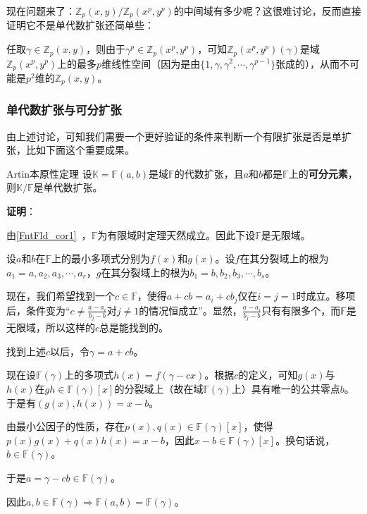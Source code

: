 现在问题来了：$\mathbb{Z}_p(x, y)/\mathbb{Z}_p(x^p, y^p)$的中间域有多少呢？这很难讨论，反而直接证明它不是单代数扩张还简单些：

任取$\gamma\in\mathbb{Z}_p(x, y)$，则由于$\gamma^p\in\mathbb{Z}_p(x^p, y^p)$，可知$\mathbb{Z}_p(x^p, y^p)(\gamma)$是域$\mathbb{Z}_p(x^p, y^p)$上的最多$p$维线性空间（因为是由$\{1,\gamma, \gamma^2, \cdots, \gamma^{p-1}\}$张成的），从而不可能是$p^2$维的$\mathbb{Z}_p(x, y)$。


\subsubsection{单代数扩张与可分扩张}

由上述讨论，可知我们需要一个更好验证的条件来判断一个有限扩张是否是单扩张，比如下面这个重要成果。

\begin{theorem}{Artin本原性定理}\label{PrmtEl_the2}
设$\mathbb{K}=\mathbb{F}(a, b)$是域$\mathbb{F}$的代数扩张，且$a$和$b$都是$\mathbb{F}$上的\textbf{可分元素}，则$\mathbb{K}/\mathbb{F}$是单代数扩张。
\end{theorem}

\textbf{证明}：

由\autoref{FntFld_cor1}~，$\mathbb{F}$为有限域时定理天然成立。因此下设$\mathbb{F}$是无限域。

设$a$和$b$在$\mathbb{F}$上的最小多项式分别为$f(x)$和$g(x)$。设$f$在其分裂域上的根为$a_1=a, a_2, a_3, \cdots, a_r$，$g$在其分裂域上的根为$b_1=b, b_2, b_3, \cdots, b_s$。

现在，我们希望找到一个$c\in\mathbb{F}$，使得$a+cb=a_i+cb_j$仅在$i=j=1$时成立。移项后，条件变为“$c\neq\frac{a-a_i}{b_j-b}$对$j\neq 1$的情况恒成立”。显然，$\frac{a-a_i}{b_j-b}$只有有限多个，而$\mathbb{F}$是无限域，所以这样的$c$总是能找到的。

找到上述$c$以后，令$\gamma=a+cb$。

现在设$\mathbb{F}(\gamma)$上的多项式$h(x)=f(\gamma-cx)$。根据$c$的定义，可知$g(x)$与$h(x)$在$gh\in\mathbb{F}(\gamma)[x]$的分裂域上（故在域$\mathbb{F}(\gamma)$上）具有唯一的公共零点$b$。于是有$(g(x), h(x))=x-b$。

由最小公因子的性质，存在$p(x), q(x)\in\mathbb{F}(\gamma)[x]$，使得$p(x)g(x)+q(x)h(x)=x-b$，因此$x-b\in\mathbb{F}(\gamma)[x]$。换句话说，$b\in\mathbb{F}(\gamma)$。

于是$a=\gamma-cb\in\mathbb{F}(\gamma)$。

因此$a, b\in\mathbb{F}(\gamma)\Rightarrow \mathbb{F}(a, b)=\mathbb{F}(\gamma)$。


